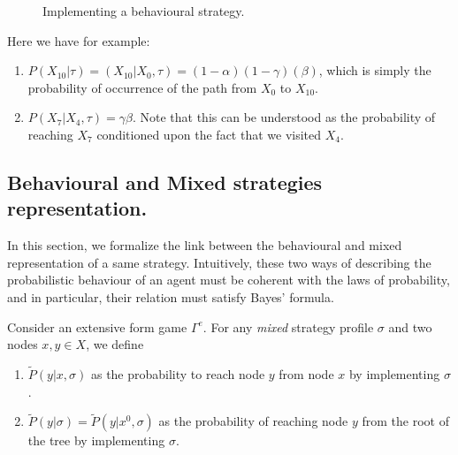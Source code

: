 \begin{example}
\begin{figure}[!ht]
\begin{center}
\label{ch4:fig:exampleFormalism2}
\end{center}
\caption{Implementing a behavioural strategy.}
\label{ch4:fig:ExtFormProba}
\end{figure}
Here we have for example:
\begin{enumerate}
\item $P(X_{10} | \tau) = (X_{10} | X_0, \tau) = (1-\alpha)  (1-\gamma) (\beta)$, which is simply the probability of occurrence of the path from $X_0$ to $X_{10}$.
\item $P(X_7 | X_4,\tau ) = \gamma \beta$. Note that this can be understood as the probability of reaching $X_7$ conditioned upon the fact that we visited $X_4$.
\end{enumerate}
\end{example}

\subsection{Behavioural and Mixed strategies representation.}

In this section, we formalize the link between the behavioural and mixed representation of a same strategy. 
Intuitively, these two ways of describing the probabilistic behaviour of an agent must be coherent with the laws of probability, and in particular, their relation must satisfy Bayes' formula.
\begin{definition}
Consider an extensive form game $\Gamma^e$. For any \emph{mixed} strategy profile $\sigma$ and two nodes $x,y \in X$, we define 
\begin{enumerate}
\item $\tilde P(y | x, \sigma)$ as the probability to reach node $y$ from node $x$ by implementing $\sigma$.
\item $ \tilde P(y|\sigma) = \tilde P(y | x^0, \sigma)$ as the probability of reaching node $y$ from the root of the tree by implementing $\sigma$.
\end{enumerate}
\end{definition}


